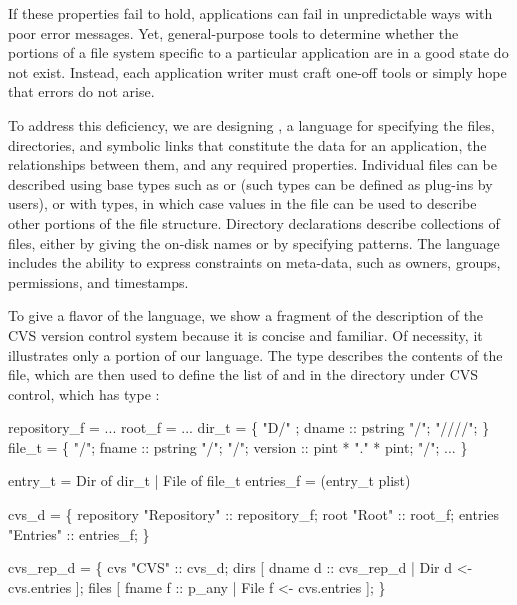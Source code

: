 \documentclass[nocopyrightspace,10pt]{sigplanconf}
\begin{document}
If these properties fail to hold, applications can fail in
unpredictable ways with poor error messages.  Yet, general-purpose
tools to determine whether the portions of a file system specific to a
particular application are in a good state do not exist.  Instead, each
application writer must craft one-off tools or simply hope that errors
do not arise. 

To address this deficiency, we are designing \dirpads{}, a language
for specifying the files, directories, and symbolic links that
constitute the data for an application, the relationships between
them, and any required properties.  Individual files can be described
using base types such as  or  (such types can be
defined as plug-ins by users), or with \pads{}
types, in which case values in the file can be used to describe other
portions of the file structure.  Directory declarations describe
collections of files, either by giving the on-disk names or by
specifying patterns.   The language
includes the ability to express constraints on meta-data, such as
owners, groups, permissions, and timestamps.  

To give a flavor of the language, we show a fragment of the
description of the CVS version control system because it is concise
and familiar.  Of necessity, it illustrates only a portion of our
language.  The \pads{} type  describes the
contents of the  file, which are then used to define the
list of  and  in the directory under CVS control,
which has \dirpads{} type :


\begin{code}
 repository_f = ...
 root_f = ...
 dir_t =  \{
  "D/" ;
  dname :: pstring "/";
  "////"; \} 
 file_t =  \{
  "/";
  fname :: pstring "/";        "/";
  version  :: pint * "." * pint;  "/";
  ... \}

 entry_t = Dir of dir_t | File of file_t
 entries_f =  (entry_t plist)

 cvs_d =  \{
  repository  "Repository" :: repository_f;
  root        "Root"       :: root_f;
  entries     "Entries"    :: entries_f; \}

  cvs_rep_d =  \{
  cvs    "CVS" :: cvs_d;
  dirs   [ dname d  :: cvs_rep_d | 
                  Dir  d <- cvs.entries ];
  files  [ fname f :: p_any      | 
                  File f <- cvs.entries ];
\}

\end{code}
\end{document}
